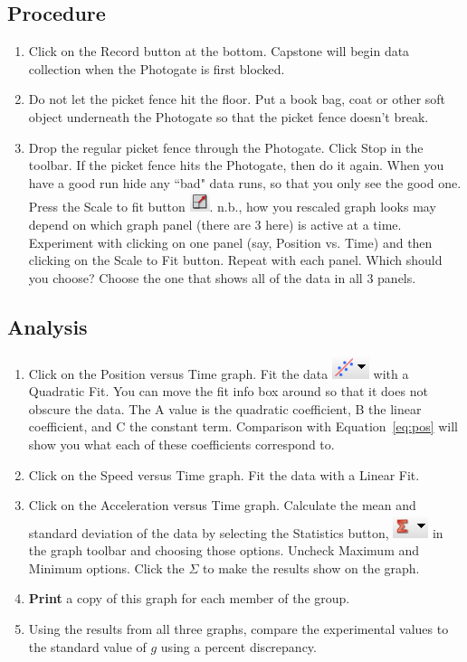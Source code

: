 \documentclass[main.tex]{subfiles}
\begin{document}
\subsection*{Procedure}
\begin{enumerate}
\item
Click on the Record button at the bottom. Capstone will begin data collection when the Photogate is first blocked.
\item
Do not let the picket fence hit the floor. Put a book bag, coat or other soft object underneath the Photogate so that the picket fence doesn't break.
\item
Drop the regular picket fence through the Photogate. Click Stop in the toolbar. If the picket fence hits the Photogate, then do it again. When you have a good run hide any ``bad" data runs, so that you only see the good one. Press the Scale to fit button \includegraphics{Rescale}. n.b., how you rescaled graph looks may depend on which graph panel (there are 3 here) is active at a time. Experiment with clicking on one panel (say, Position vs. Time) and then clicking on the Scale to Fit button. Repeat with each panel. Which should you choose? Choose the one that shows all of the data in all 3 panels.
\end{enumerate}

\subsection*{Analysis}
\begin{enumerate}
\item
Click on the Position versus Time graph. Fit the data \includegraphics{Curve_Fit} with a Quadratic Fit. You can move the fit info box around so that it does not obscure the data. The A value is the quadratic coefficient, B the linear coefficient, and C the constant term. Comparison with Equation~\eqref{eq:pos} will show you what each of these coefficients correspond to. 
\item
Click on the Speed versus Time graph. Fit the data with a Linear Fit. 
\item
Click on the Acceleration versus Time graph. Calculate the mean and standard deviation of the data by selecting the Statistics button, \includegraphics{Statistics} in the graph toolbar and choosing those options. Uncheck Maximum and Minimum options. Click the $\Sigma$ to make the results show on the graph. 
\item
\textbf{Print} a copy of this graph for each member of the group.
\item
Using the results from all three graphs, compare the experimental values to the standard value of $g$ using a percent discrepancy.
\end{enumerate}
\end{document}
